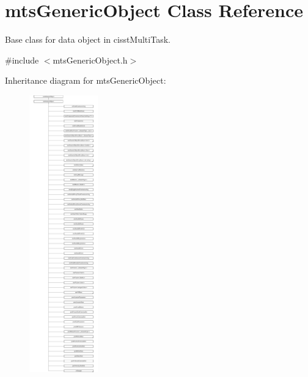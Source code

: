 \hypertarget{classmts_generic_object}{\section{mts\-Generic\-Object Class Reference}
\label{classmts_generic_object}
}


Base class for data object in cisst\-Multi\-Task.  




{\ttfamily \#include $<$mts\-Generic\-Object.\-h$>$}

Inheritance diagram for mts\-Generic\-Object\-:\begin{figure}[H]
\begin{center}
\leavevmode
\includegraphics[height=12.000000cm]{d2/d5f/classmts_generic_object}
\end{center}
\end{figure}
